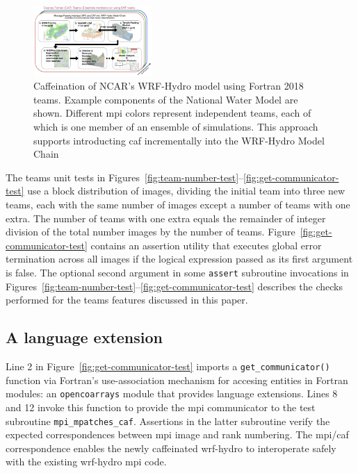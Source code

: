 \begin{figure}
\includegraphics[width=0.4\textwidth]{figures/WRF-Hydro-caf-ens-model_chain.png}
\vspace{-7pt}
\caption{Caffeination of NCAR's WRF-Hydro model using Fortran 2018
  teams. Example components of  the National Water
  Model are shown. Different \gls{mpi} colors represent independent teams,
  each of which is one member of an ensemble of simulations.
  This approach supports introducting \gls{caf} incrementally
  into the WRF-Hydro Model Chain
  \label{fig:caffeinate-wrf-hydro}}
\end{figure}
%

The teams unit tests in
Figures~\ref{fig:team-number-test}--\ref{fig:get-communicator-test} use a block distribution of images,
dividing the initial team into three new teams, each with the same number of images except a number of teams
with one extra. The number of teams with one extra equals the remainder of integer division of the total
number images by the number of teams. Figure~\ref{fig:get-communicator-test} contains an assertion
utility that executes global error termination across all images if the logical expression passed as its
first argument is false.  The optional second argument in some
\texttt{assert} subroutine invocations in Figures~\ref{fig:team-number-test}--\ref{fig:get-communicator-test}
describes the checks performed for the teams features discussed in this paper.

\subsection{A language extension}
Line 2 in Figure~\ref{fig:get-communicator-test} imports a \texttt{get\_communicator()} function via Fortran's
use-association mechanism for accesing entities in Fortran modules: an \texttt{opencoarrays} module that
provides language extensions.  Lines 8 and 12 invoke this function
to provide the \gls{mpi} communicator to the test subroutine \texttt{mpi\_mpatches\_caf}.  Assertions in the
latter subroutine verify the expected correspondences between \gls{mpi} image and rank numbering.
The \gls{mpi}/\gls{caf} correspondence enables the newly caffeinated \gls{wrf-hydro}
to interoperate safely with the existing \gls{wrf-hydro} \gls{mpi} code.


